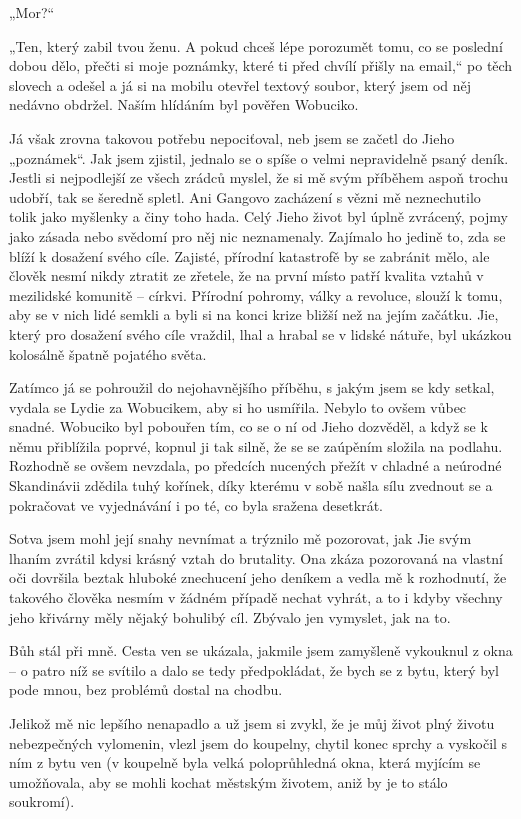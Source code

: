 „Mor?“

„Ten, který zabil tvou ženu. A pokud chceš lépe porozumět tomu, co se poslední dobou dělo, přečti si moje poznámky, které ti před chvílí přišly na email,“ po těch slovech a odešel a já si na mobilu otevřel textový soubor, který jsem od něj nedávno obdržel. Naším hlídáním byl pověřen Wobuciko.

 Já však zrovna takovou potřebu nepociťoval, neb jsem se začetl do Jieho „poznámek“. Jak jsem zjistil, jednalo se o spíše o velmi nepravidelně psaný deník. Jestli si nejpodlejší ze všech zrádců myslel, že si mě svým příběhem aspoň trochu udobří, tak se šeredně spletl. Ani Gangovo zacházení s vězni mě neznechutilo tolik jako myšlenky a činy toho hada. Celý Jieho život byl úplně zvrácený, pojmy jako zásada nebo svědomí pro něj nic neznamenaly. Zajímalo ho jedině to, zda se blíží k dosažení svého cíle. Zajisté, přírodní katastrofě by se zabránit mělo, ale člověk nesmí nikdy ztratit ze zřetele, že na první místo patří kvalita vztahů v mezilidské komunitě – církvi. Přírodní pohromy, války a revoluce, slouží k tomu, aby se v nich lidé semkli a byli si na konci krize bližší než na jejím začátku. Jie, který pro dosažení svého cíle vraždil, lhal a hrabal se v lidské nátuře, byl ukázkou kolosálně špatně pojatého světa.
 
Zatímco já se pohroužil do nejohavnějšího příběhu, s jakým jsem se kdy setkal, vydala se Lydie za Wobucikem, aby si ho usmířila. Nebylo to ovšem vůbec snadné. Wobuciko byl pobouřen tím, co se o ní od Jieho dozvěděl, a když se k němu přiblížila poprvé, kopnul ji tak silně, že se se zaúpěním složila na podlahu. Rozhodně se ovšem nevzdala, po předcích nucených přežít v chladné a neúrodné Skandinávii zdědila tuhý kořínek, díky kterému v sobě našla sílu zvednout se a pokračovat ve vyjednávání i po té, co byla sražena desetkrát.  

Sotva jsem mohl její snahy nevnímat a trýznilo mě pozorovat, jak Jie svým lhaním zvrátil kdysi krásný vztah do brutality. Ona zkáza pozorovaná na vlastní oči dovršila beztak hluboké znechucení jeho deníkem a vedla mě k rozhodnutí, že takového člověka nesmím v žádném případě nechat vyhrát, a to i kdyby všechny jeho křivárny měly nějaký bohulibý cíl. Zbývalo jen vymyslet, jak na to.

Bůh stál při mně. Cesta ven se ukázala, jakmile jsem zamyšleně vykouknul z okna – o patro níž se svítilo a dalo se tedy předpokládat, že bych se z bytu, který byl pode mnou, bez problémů dostal na chodbu.

Jelikož mě nic lepšího nenapadlo a už jsem si zvykl, že je můj život plný životu nebezpečných vylomenin, vlezl jsem do koupelny, chytil konec sprchy a vyskočil s ním z bytu ven (v koupelně byla velká poloprůhledná okna, která myjícím se umožňovala, aby se mohli kochat městským životem, aniž by je to stálo soukromí).

